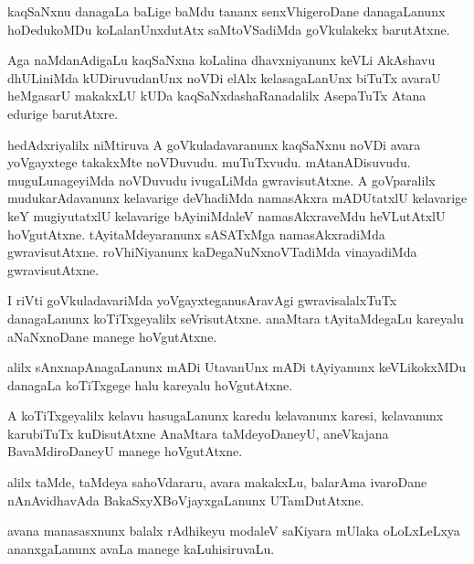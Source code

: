 \documentclass{article}
\begin{document}
\begin{mn}%
kaqSaNxnu danagaLa baLige baMdu tananx senxVhigeroDane danagaLanunx hoDedukoMDu 
koLalanUnxdutAtx saMtoVSadiMda goVkulakekx barutAtxne.
\end{mn}

\begin{mn}%
Aga naMdanAdigaLu kaqSaNxna koLalina dhavxniyanunx keVLi AkAshavu dhULiniMda kUDiruvudanUnx
noVDi elAlx kelasagaLanUnx biTuTx avaraU heMgasarU makakxLU kUDa kaqSaNxdashaRanadalilx 
AsepaTuTx Atana edurige barutAtxre.
\end{mn}

\begin{mn}%
hedAdxriyalilx niMtiruva A goVkuladavaranunx kaqSaNxnu noVDi avara yoVgayxtege takakxMte 
noVDuvudu. muTuTxvudu. mAtanADisuvudu. muguLunageyiMda noVDuvudu ivugaLiMda 
gwravisutAtxne. A goVparalilx mudukarAdavanunx kelavarige deVhadiMda namasAkxra mADUtatxlU 
kelavarige keY mugiyutatxlU kelavarige bAyiniMdaleV namasAkxraveMdu heVLutAtxlU 
hoVgutAtxne. tAyitaMdeyaranunx sASATxMga namasAkxradiMda gwravisutAtxne. roVhiNiyanunx 
kaDegaNuNxnoVTadiMda vinayadiMda gwravisutAtxne.
\end{mn}

\begin{mn}%
I riVti goVkuladavariMda yoVgayxteganusAravAgi gwravisalalxTuTx danagaLanunx 
koTiTxgeyalilx seVrisutAtxne. anaMtara tAyitaMdegaLu kareyalu aNaNxnoDane manege 
hoVgutAtxne.
\end{mn}

\begin{mn}%
alilx sAnxnapAnagaLanunx mADi UtavanUnx mADi tAyiyanunx keVLikokxMDu danagaLa koTiTxgege 
halu kareyalu hoVgutAtxne.
\end{mn}

\begin{mn}%
A koTiTxgeyalilx kelavu hasugaLanunx karedu kelavanunx karesi, kelavanunx karubiTuTx 
kuDisutAtxne AnaMtara taMdeyoDaneyU, aneVkajana BavaMdiroDaneyU manege hoVgutAtxne.
\end{mn}

\begin{mn}%
alilx taMde, taMdeya sahoVdararu, avara makakxLu, balarAma ivaroDane nAnAvidhavAda 
BakaSxyXBoVjayxgaLanunx UTamDutAtxne.
\end{mn}

\begin{mn}%
avana manasasxnunx balalx rAdhikeyu modaleV saKiyara mUlaka oLoLxLeLxya ananxgaLanunx 
avaLa manege kaLuhisiruvaLu.
\end{mn}
\end{document}
